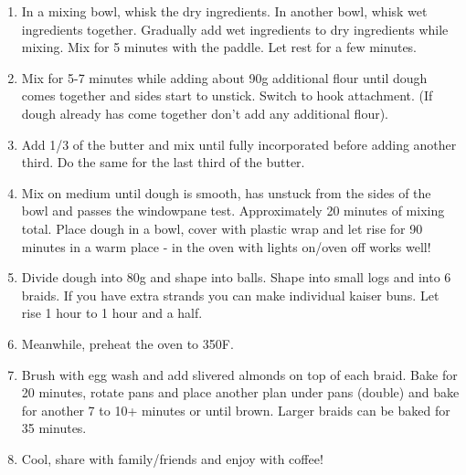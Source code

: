 \begin{enumerate}
    \item In a mixing bowl, whisk the dry ingredients. In another bowl, whisk wet ingredients together. Gradually add wet ingredients to dry ingredients while mixing. Mix for 5 minutes with the paddle. Let rest for a few minutes.
    \item Mix for 5-7 minutes while adding about 90g additional flour until dough comes together and sides start to unstick. Switch to hook attachment. (If dough already has come together don't add any additional flour).
    \item Add 1/3 of the butter and mix until fully incorporated before adding another third. Do the same for the last third of the butter.
    \item Mix on medium until dough is smooth, has unstuck from the sides of the bowl and passes the windowpane test. Approximately 20 minutes of mixing total. Place dough in a bowl, cover with plastic wrap and let rise for 90 minutes in a warm place - in the oven with lights on/oven off works well!
    \item Divide dough into 80g and shape into balls. Shape into small logs and into 6 braids. If you have extra strands you can make individual kaiser buns. Let rise 1 hour to 1 hour and a half. 
    \item Meanwhile, preheat the oven to 350\degree F.
    \item Brush with egg wash and add slivered almonds on top of each braid. Bake for 20 minutes, rotate pans and place another plan under pans (double) and bake for another 7 to 10+ minutes or until brown. Larger braids can be baked for 35 minutes.
    \item Cool, share with family/friends and enjoy with coffee!
\end{enumerate}

